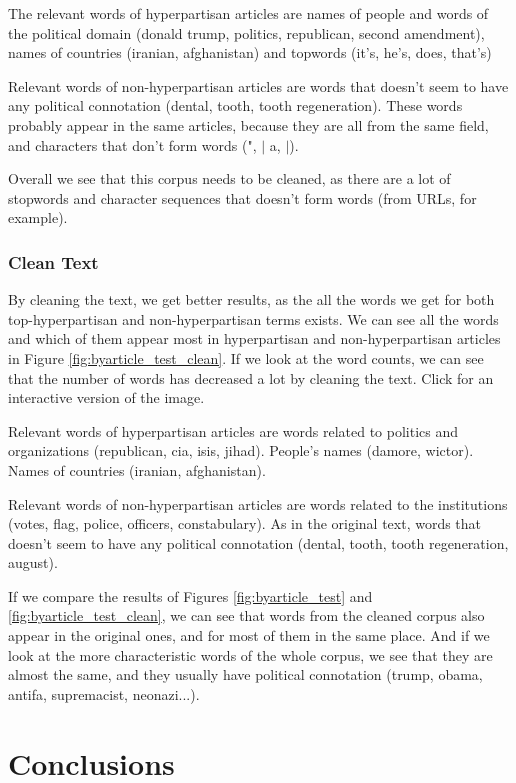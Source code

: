 \documentclass[11pt,a4paper]{article}
\begin{document}
The relevant words of hyperpartisan articles are names of people and words of the political domain (donald trump, politics, republican, second amendment), names of countries (iranian, afghanistan) and topwords (it's, he's, does, that's)

Relevant words of non-hyperpartisan articles are words that doesn't seem to have any political connotation (dental, tooth, tooth regeneration). These words probably appear in the same articles, because they are all from the same field, and characters that don't form words (", $|$ a, $|$).

Overall we see that this corpus needs to be cleaned, as there are a lot of stopwords and character sequences that doesn't form words (from URLs, for example). 

\subsubsection{Clean Text}
By cleaning the text, we get better results, as the all the words we get for both top-hyperpartisan and non-hyperpartisan terms exists. We can see all the words and which of them appear most in hyperpartisan and non-hyperpartisan articles in Figure \ref{fig:byarticle_test_clean}. If we look at the word counts, we can see that the number of words has decreased a lot by cleaning the text. Click for an interactive version of the image.

Relevant words of hyperpartisan articles are words related to politics and organizations (republican, cia, isis, jihad). People's names (damore, wictor). Names of countries (iranian, afghanistan).

Relevant words of non-hyperpartisan articles are words related to the institutions (votes, flag, police, officers, constabulary). As in the original text, words that doesn't seem to have any political connotation (dental, tooth, tooth regeneration, august).

If we compare the results of Figures \ref{fig:byarticle_test} and \ref{fig:byarticle_test_clean}, we can see that words from the cleaned corpus also appear in the original ones, and for most of them in the same place. And if we look at the more characteristic words of the whole corpus, we see that they are almost the same, and they usually have political connotation (trump, obama, antifa, supremacist, neonazi...).

\section{Conclusions}
\end{document}
